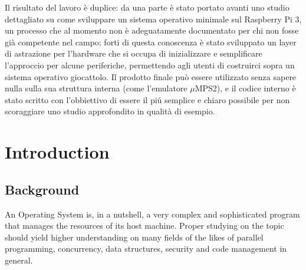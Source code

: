 \documentclass[12pt,a4paper,openright,twoside]{report}
\begin{document}
Il risultato del lavoro \`e duplice: da una parte \`e stato portato avanti uno 
studio dettagliato su come sviluppare un sistema operativo minimale sul Raspberry
Pi 3, un processo che al momento non \`e adeguatamente documentato per chi non
fosse gi\`a competente nel campo; forti di questa conoscenza \`e stato sviluppato un
layer di astrazione per l'hardware che si occupa di inizializzare e semplificare
l'approccio per alcune periferiche, permettendo agli utenti di costruirci sopra
un sistema operativo giocattolo. Il prodotto finale pu\`o essere utilizzato senza
sapere nulla sulla sua struttura interna (come l'emulatore $\mu$MPS2), e il codice 
interno \`e stato scritto con l'obbiettivo di essere il pi\'u semplice e chiaro
possibile per non scoraggiare uno studio approfondito in qualit\`a di esempio.

\renewcommand\labelitemi{\tiny$\bullet$}

\clearpage{\pagestyle{empty}\cleardoublepage}
\tableofcontents                        %
\rhead[\fancyplain{}{\bfseries\leftmark}]{\fancyplain{}{\bfseries\thepage}}
\clearpage{\pagestyle{empty}\cleardoublepage}
\listoffigures                          %
\clearpage{\pagestyle{empty}\cleardoublepage}
\listoftables                           %
\clearpage{\pagestyle{empty}\cleardoublepage}
\chapter{Introduction}                %
\lhead[\fancyplain{}{\bfseries\thepage}]{\fancyplain{}{\bfseries\rightmark}}
\section{Background}
An Operating System is, in a nutshell, a very complex and sophisticated program
that manages the resources of its host machine. Proper studying on the topic 
should yield higher understanding on many fields of the likes of
parallel programming, concurrency, data structures, security and 
code management in general.
\end{document}
